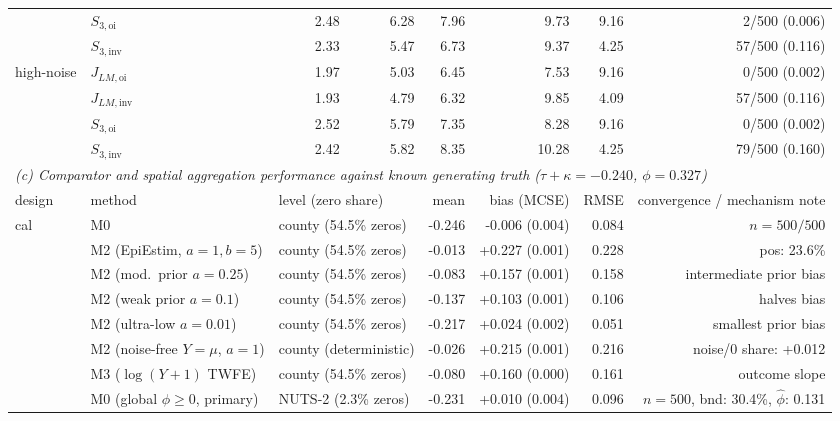 \begin{table}[!t]
\begin{adjustbox}{max width=\linewidth,max totalheight=0.68\textheight}
\begin{tabular}{llrrrrrrrrrr}
 & $S_{3,\mathrm{oi}}$ & 2.48 & 6.28 & 7.96 & 9.73 & 9.16 & \multicolumn{5}{r}{2/500 (0.006)} \\
 & $S_{3,\mathrm{inv}}$ & 2.33 & 5.47 & 6.73 & 9.37 & 4.25 & \multicolumn{5}{r}{57/500 (0.116)} \\
high-noise & $J_{LM,\mathrm{oi}}$ & 1.97 & 5.03 & 6.45 & 7.53 & 9.16 & \multicolumn{5}{r}{0/500 (0.002)} \\
 & $J_{LM,\mathrm{inv}}$ & 1.93 & 4.79 & 6.32 & 9.85 & 4.09 & \multicolumn{5}{r}{57/500 (0.116)} \\
 & $S_{3,\mathrm{oi}}$ & 2.52 & 5.79 & 7.35 & 8.28 & 9.16 & \multicolumn{5}{r}{0/500 (0.002)} \\
 & $S_{3,\mathrm{inv}}$ & 2.42 & 5.82 & 8.35 & 10.28 & 4.25 & \multicolumn{5}{r}{79/500 (0.160)} \\
\midrule
\multicolumn{12}{l}{\emph{(c) Comparator and spatial aggregation performance against known generating truth ($\tau+\kappa=-0.240$, $\phi=0.327$)}} \\
design & method & \multicolumn{2}{l}{level (zero share)} & mean & bias (MCSE) & RMSE & \multicolumn{5}{r}{convergence / mechanism note} \\
\midrule
cal & M0 & \multicolumn{2}{l}{county (54.5\% zeros)} & -0.246 & -0.006 (0.004) & 0.084 & \multicolumn{5}{r}{$n=500/500$} \\
 & M2 (EpiEstim, $a=1,b=5$) & \multicolumn{2}{l}{county (54.5\% zeros)} & -0.013 & +0.227 (0.001) & 0.228 & \multicolumn{5}{r}{pos: 23.6\%} \\
 & M2 (mod.\ prior $a=0.25$) & \multicolumn{2}{l}{county (54.5\% zeros)} & -0.083 & +0.157 (0.001) & 0.158 & \multicolumn{5}{r}{intermediate prior bias} \\
 & M2 (weak prior $a=0.1$) & \multicolumn{2}{l}{county (54.5\% zeros)} & -0.137 & +0.103 (0.001) & 0.106 & \multicolumn{5}{r}{halves bias} \\
 & M2 (ultra-low $a=0.01$) & \multicolumn{2}{l}{county (54.5\% zeros)} & -0.217 & +0.024 (0.002) & 0.051 & \multicolumn{5}{r}{smallest prior bias} \\
 & M2 (noise-free $Y=\mu$, $a=1$) & \multicolumn{2}{l}{county (deterministic)} & -0.026 & +0.215 (0.001) & 0.216 & \multicolumn{5}{r}{noise/0 share: +0.012} \\
 & M3 ($\log(Y+1)$ TWFE) & \multicolumn{2}{l}{county (54.5\% zeros)} & -0.080 & +0.160 (0.000) & 0.161 & \multicolumn{5}{r}{outcome slope} \\
 & M0 (global $\phi\ge 0$, primary) & \multicolumn{2}{l}{NUTS-2 (2.3\% zeros)} & -0.231 & +0.010 (0.004) & 0.096 & \multicolumn{5}{r}{$n=500$, bnd: 30.4\%, $\hat\phi$: 0.131} \\

\end{tabular}
\end{adjustbox}
\end{table}
